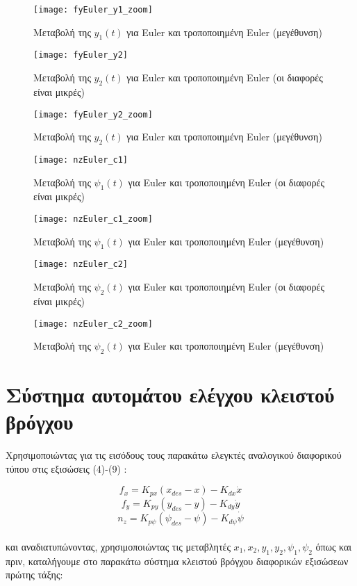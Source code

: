 \documentclass{article}
\begin{document}
\begin{figure}[h!]
 \centering
\texttt{[image: fyEuler\_y1\_zoom]}
\caption{Μεταβολή της $y_1(t)$ για Euler και τροποποιημένη Euler (μεγέθυνση)}
\label{l_6}
\end{figure}
\clearpage

\clearpage
\begin{figure}[h!]
\centering
\texttt{[image: fyEuler\_y2]}
\caption{Μεταβολή της $y_2(t)$ για Euler και τροποποιημένη Euler (οι διαφορές είναι μικρές)}
\end{figure}


\begin{figure}[h!]
 \centering
\texttt{[image: fyEuler\_y2\_zoom]}
\caption{Μεταβολή της $y_2(t)$ για Euler και τροποποιημένη Euler (μεγέθυνση)}
\label{l_8}
\end{figure}
\clearpage

\clearpage
\begin{figure}[h!]
\texttt{[image: nzEuler\_c1]}
\caption{Μεταβολή της $\psi_1(t)$ για Euler και τροποποιημένη
 Euler (οι διαφορές είναι μικρές)}
\end{figure}

\begin{figure}[h!]
\texttt{[image: nzEuler\_c1\_zoom]}
\caption{Μεταβολή της $\psi_1(t)$ για Euler και τροποποιημένη Euler (μεγέθυνση)}
\label{l_10}
\end{figure}
\clearpage

\clearpage
\begin{figure}[h!]
\texttt{[image: nzEuler\_c2]}
\caption{Μεταβολή της $\psi_2(t)$ για Euler και τροποποιημένη Euler (οι διαφορές είναι μικρές)}
\end{figure}

\begin{figure}[h!]
\texttt{[image: nzEuler\_c2\_zoom]}
\caption{Μεταβολή της $\psi_2(t)$ για Euler και τροποποιημένη Euler (μεγέθυνση)}
\label{l_12}
\end{figure}
\clearpage

\section{Σύστημα αυτομάτου ελέγχου κλειστού βρόγχου}
Χρησιμοποιώντας για τις εισόδους τους παρακάτω ελεγκτές αναλογικού διαφορικού τύπου στις εξισώσεις (4)-(9) :

\[f_x = K_{px}(x_{des} - x) - K_{dx}\dot{x} \]
\[f_y = K_{py}(y_{des} - y) - K_{dy}\dot{y} \]
\[n_z = K_{p\psi}(\psi_{des} - \psi) - K_{d\psi}\dot{\psi} \]
\\
και αναδιατυπώνοντας, χρησιμοποιώντας τις μεταβλητές \(x_1, x_2, y_1, y_2, \psi_1, \psi_2\) όπως και πριν, καταλήγουμε στο παρακάτω σύστημα κλειστού βρόγχου διαφορικών εξισώσεων πρώτης τάξης:
\end{document}
